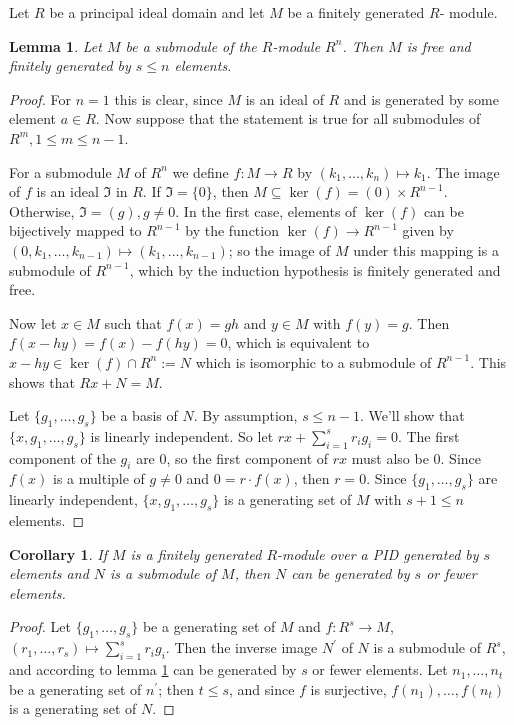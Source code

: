 \documentclass[12pt]{article}
\newtheorem*{cor*}{Corollary}
\newtheorem*{lem*}{Lemma}
\begin{document}

Let $R$ be a principal ideal domain and let $M$ be a finitely generated $R$-
module.

\begin{lem*}
\label{l1}
Let $M$ be a submodule of the $R$-module $R^n$. Then $M$ is 
free and finitely generated by $s\le n$ elements.
\end{lem*}
\begin{proof}
For $n=1$ this is clear,
since $M$ is an ideal of $R$ and is generated by some element $a \in R$.
Now suppose that the statement is true
for all submodules of $R^m, 1 \le m \le n-1$.

For a submodule $M$ of $R^n$
we define $f\colon M\to R$ by $(k_1, \ldots, k_n) \mapsto k_1$.
The image of $f$ is an ideal $\mathfrak{I}$ in $R$.
If $\mathfrak{I}=\{0\}$, then $M \subseteq \ker(f)=(0) \times R^{n-1}$.
Otherwise, $\mathfrak{I}=(g), g \ne 0$.
In the first case, elements of $\ker(f)$
can be bijectively mapped to $R^{n-1}$ by the function 
$\ker(f) \to R^{n-1}$ given by
$(0, k_1, \ldots, k_{n-1}) \mapsto (k_1,\ldots, k_{n-1})$;
so the image of $M$ under this mapping is a submodule of $R^{n-1}$,
which by the induction hypothesis is finitely generated and free.

Now let $x \in M$ such that $f(x) =gh$ and $y \in M$ with $f(y)=g$.
Then $f(x-hy)=f(x) -f(hy)=0$,
which is equivalent to $x-hy \in \ker(f) \cap R^n:=N$
which is isomorphic to a submodule of $R^{n-1}$.
This shows that $Rx+N=M$.

Let $\{g_1, \ldots, g_s\}$ be a basis of $N$.
By assumption, $s \le n-1$.
We'll show that $\{x, g_1, \ldots, g_s\}$ is linearly independent.
So let $rx +\sum_{i=1}^s r_ig_i=0$.
The first component of the $g_i$ are 0,
so the first component of $rx$ must also be 0.
Since $f(x)$ is a multiple of $g \ne 0$ and $0=r\cdot f(x)$, then $r=0$.
Since $\{g_1, \ldots, g_s\}$ are linearly independent,
$\{x, g_1, \ldots, g_s\}$ is a generating set of $M$ with $s+1\le n$ elements.
\end{proof}

\begin{cor*}
\label{c1}
If $M$ is a finitely generated $R$-module
over a PID generated by $s$ elements
and $N$ is a submodule of $M$,
then $N$ can be generated by $s$ or fewer elements.
\end{cor*}
\begin{proof}
Let $\{g_1, \ldots, g_s\}$ be a generating set of $M$
and $f\colon R^s \to M$, $(r_1, \ldots, r_s) \mapsto \sum_{i=1}^s r_ig_i$.
Then the inverse image $N^{'}$ of $N$ is a submodule of $R^s$,
and according to lemma \ref{l1} can be generated by $s$ or fewer elements.
Let $n_1,\ldots, n_t$ be a generating set of $n^{'}$;
then $t \le s$, and since $f$ is surjective,
$f(n_1), \ldots, f(n_t)$ is a generating set of $N$.
\end{proof}
\end{document}
